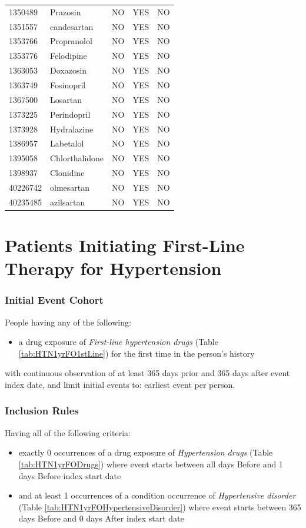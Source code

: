 \documentclass[11pt]{book}
\providecommand{\tightlist}{%
  \setlength{\itemsep}{0pt}\setlength{\parskip}{0pt}}
\theoremstyle{definition}
\theoremstyle{definition}
\theoremstyle{definition}
\theoremstyle{remark}
\begin{document}
\begin{longtable}[]{@{}lllll@{}}
1350489 & Prazosin & NO & YES & NO\tabularnewline
1351557 & candesartan & NO & YES & NO\tabularnewline
1353766 & Propranolol & NO & YES & NO\tabularnewline
1353776 & Felodipine & NO & YES & NO\tabularnewline
1363053 & Doxazosin & NO & YES & NO\tabularnewline
1363749 & Fosinopril & NO & YES & NO\tabularnewline
1367500 & Losartan & NO & YES & NO\tabularnewline
1373225 & Perindopril & NO & YES & NO\tabularnewline
1373928 & Hydralazine & NO & YES & NO\tabularnewline
1386957 & Labetalol & NO & YES & NO\tabularnewline
1395058 & Chlorthalidone & NO & YES & NO\tabularnewline
1398937 & Clonidine & NO & YES & NO\tabularnewline
40226742 & olmesartan & NO & YES & NO\tabularnewline
40235485 & azilsartan & NO & YES & NO\tabularnewline
\bottomrule
\end{longtable}

\section{Patients Initiating First-Line Therapy for
Hypertension}\label{HTN1yrFO}

\subsubsection*{Initial Event Cohort}\label{initial-event-cohort-5}

People having any of the following:

\begin{itemize}
\tightlist
\item
  a drug exposure of \emph{First-line hypertension drugs} (Table
  \ref{tab:HTN1yrFO1stLine}) for the first time in the person's history
\end{itemize}

with continuous observation of at least 365 days prior and 365 days
after event index date, and limit initial events to: earliest event per
person.

\subsubsection*{Inclusion Rules}\label{inclusion-rules-2}

Having all of the following criteria:

\begin{itemize}
\tightlist
\item
  exactly 0 occurrences of a drug exposure of \emph{Hypertension drugs}
  (Table \ref{tab:HTN1yrFODrugs}) where event starts between all days
  Before and 1 days Before index start date
\item
  and at least 1 occurrences of a condition occurrence of
  \emph{Hypertensive disorder} (Table
  \ref{tab:HTN1yrFOHypertensiveDisorder}) where event starts between 365
  days Before and 0 days After index start date
\end{itemize}
\end{document}
